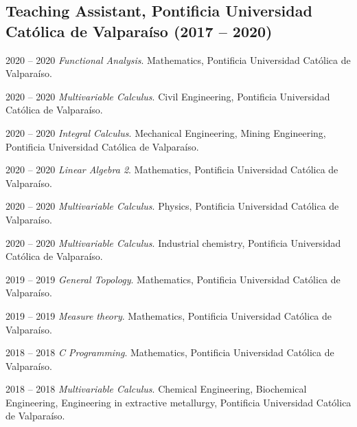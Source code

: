 \documentclass[12pt,letterpaper]{report}
\begin{document}
    \subsection*{Teaching Assistant, Pontificia Universidad Cat\'olica de Valpara\'iso (2017 -- 2020)}

    \begin{tablist}

        \item[2020 -- 2020] \tab \emph{Functional Analysis}. Mathematics, Pontificia Universidad Cat\'olica de Valpara\'iso. 
            
        \item[2020 -- 2020] \tab \emph{Multivariable Calculus}. Civil Engineering, Pontificia Universidad Cat\'olica de Valpara\'iso. 
            
        \item[2020 -- 2020] \tab \emph{Integral Calculus}. Mechanical Engineering, Mining Engineering, Pontificia Universidad Cat\'olica de Valpara\'iso. 
            
        \item[2020 -- 2020] \tab \emph{Linear Algebra 2}. Mathematics, Pontificia Universidad Cat\'olica de Valpara\'iso.
            
        \item[2020 -- 2020] \tab \emph{Multivariable Calculus}. Physics, Pontificia Universidad Cat\'olica de Valpara\'iso. 
            
        \item[2020 -- 2020] \tab \emph{Multivariable Calculus}. Industrial chemistry, Pontificia Universidad Cat\'olica de Valpara\'iso. 
        
        \item[2019 -- 2019] \tab \emph{General Topology}. Mathematics, Pontificia Universidad Cat\'olica de Valpara\'iso. 
            
        \item[2019 -- 2019] \tab \emph{Measure theory}. Mathematics, Pontificia Universidad Cat\'olica de Valpara\'iso. 
            
        \item[2018 -- 2018] \tab \emph{C Programming}. Mathematics, Pontificia Universidad Cat\'olica de Valpara\'iso. 
            
        \item[2018 -- 2018] \tab \emph{Multivariable Calculus}. Chemical Engineering, Biochemical Engineering, Engineering in extractive metallurgy, Pontificia Universidad Cat\'olica de Valpara\'iso. 
         

\end{tablist}
\end{document}
